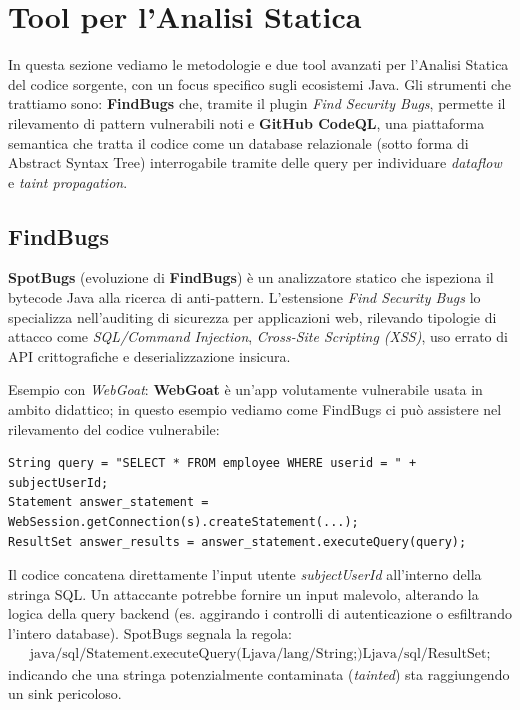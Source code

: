 \section{Tool per l'Analisi Statica}

In questa sezione vediamo le metodologie e due tool avanzati per l'Analisi Statica del 
codice sorgente, con un focus specifico sugli ecosistemi Java. Gli strumenti che trattiamo
sono: \textbf{FindBugs} che, tramite il plugin \textit{Find Security Bugs}, permette 
il rilevamento di pattern vulnerabili noti e \textbf{GitHub CodeQL}, una piattaforma 
semantica che tratta il codice come un database relazionale (sotto forma di Abstract
Syntax Tree) interrogabile tramite delle query per individuare \textit{dataflow} e
\textit{taint propagation}.

\subsection{FindBugs}

\textbf{SpotBugs} (evoluzione di \textbf{FindBugs}) è un analizzatore statico che ispeziona il 
bytecode Java alla ricerca di anti-pattern. L'estensione \textit{Find Security Bugs} 
lo specializza nell'auditing di sicurezza per applicazioni web, rilevando tipologie 
di attacco come \textit{SQL/Command Injection}, \textit{Cross-Site Scripting (XSS)}, 
uso errato di API crittografiche e deserializzazione insicura.

Esempio con \textit{WebGoat}: \textbf{WebGoat} è un'app volutamente vulnerabile usata 
in ambito didattico; in questo esempio vediamo come FindBugs ci può assistere nel 
rilevamento del codice vulnerabile:

\begin{lstlisting}
String query = "SELECT * FROM employee WHERE userid = " + subjectUserId;
Statement answer_statement = WebSession.getConnection(s).createStatement(...);
ResultSet answer_results = answer_statement.executeQuery(query);
\end{lstlisting}

Il codice concatena direttamente l'input utente \textit{subjectUserId} all'interno 
della stringa SQL. Un attaccante potrebbe fornire un input malevolo, alterando la 
logica della query backend (es. aggirando i controlli di autenticazione o 
esfiltrando l'intero database). SpotBugs segnala la regola: 
\begin{gather*}
\text{java/sql/Statement.executeQuery(Ljava/lang/String;)Ljava/sql/ResultSet;}
\end{gather*}
indicando che una stringa potenzialmente contaminata (\textit{tainted}) sta 
raggiungendo un sink pericoloso.

